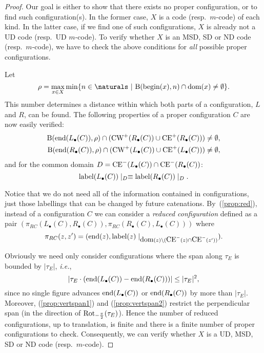 \documentclass[final,nomarks]{dmtcs-episciences}
\newcommand{\dfbegin}[1]{\mbox{\rm begin}(#1)}
\newcommand{\dfend}[1]{\mbox{\rm end}(#1)}
\newcommand{\dflabel}[1]{\mbox{\rm label}(#1)}
\newcommand{\dfdomain}[1]{\mbox{\rm dom}(#1)}
\newcommand{\CEP}[1]{\mbox{\rm CE}^+(#1)}\newcommand{\CEN}[1]{\mbox{\rm CE}^-(#1)}\newcommand{\CWP}[1]{\mbox{\rm CW}^+(#1)}\newcommand{\CWN}[1]{\mbox{\rm CW}^-(#1)}\newcommand{\B}[2]{\mbox{\rm B}(#1,#2)}\newcommand{\HP}[2]{\mbox{\rm HP}(#1,#2)}\newcommand{\R}[2]{\mbox{\rm Rot}_{#1}(#2)}\newcommand{\tr}[1]{\mathrm{tr}_{#1}}
\begin{document}
\begin{proof}
Our goal is either to show that there exists no proper
configuration, or to find such configuration(s). In the former
case, $X$ is a code (resp.\ $m$-code) of each kind. In the
latter case, if we find one of such configurations, $X$ is
already not a UD code (resp.\ UD $m$-code). To verify whether
$X$ is an MSD, SD or ND code (resp.\ $m$-code), we have to check
the above conditions for \emph{all} possible proper
configurations.

Let
\begin{displaymath}
\rho = \max_{x\in X}\min\{ n\in\naturals~|~\B{\dfbegin{x}}{n}\cap\dfdomain{x} \neq\emptyset\}.
\end{displaymath}
This number determines a distance within which both parts 
of a configuration, $L$ and $R$, can be found.
The following properties of a proper configuration $C$ are now easily verified:
\begin{eqnarray}
\label{prop:vertspan1}\B{\dfend{L_{\bullet}(C)}}{\rho} \cap (\CWP{R_{\bullet}(C)}\cup \CEP{R_{\bullet}(C)}) \neq \emptyset,\\
\label{prop:vertspan2}\B{\dfend{R_{\bullet}(C)}}{\rho} \cap (\CWP{L_{\bullet}(C)}\cup \CEP{L_{\bullet}(C)}) \neq \emptyset,
\end{eqnarray}
and for the common domain $D=\CEN{L_{\bullet}(C)}\cap\CEN{R_{\bullet}(C)}$:
\begin{equation}
\label{prop:red}\dflabel{L_{\bullet}(C)}\mid_{D}\equiv\dflabel{R_{\bullet}(C)}\mid_{D}.
\end{equation}

Notice that we do not need all of the information contained in
configurations, just those labellings that can be changed by
future catenations. By~(\ref{prop:red}), instead of a
configuration $C$ we can consider a \emph{reduced configuration}
defined as a pair
$(\pi_{RC}(L_{\bullet}(C),R_{\bullet}(C)),\pi_{RC}(R_{\bullet}(C),L_{\bullet}(C)))$
where
\begin{displaymath}
\pi_{RC}(z,z') = (\dfend{z},\dflabel{z}\mid_{\dfdomain{z}\setminus(\CEN{z}\cap \CEN{z'})}).
\end{displaymath}

Obviously we need only consider configurations where the span
along $\tau_E$ is bounded by $|\tau_E|$, \textit{i.e.},
\begin{displaymath}
|\tau_E\cdot(\dfend{L_{\bullet}(C)}-\dfend{R_{\bullet}(C)})|\leq |\tau_E|^2,
\end{displaymath}
since no single figure advances
$\dfend{L_{\bullet}(C)}$ or $\dfend{R_{\bullet}(C)}$ by more
than $|\tau_E|$. Moreover, (\ref{prop:vertspan1}) and
(\ref{prop:vertspan2}) restrict the perpendicular span (in the
direction of $\R{-\frac{\pi}{2}}{\tau_E}$). Hence the number of
reduced configurations, up to translation, is finite and there
is a finite number of proper configurations to check.
Consequently, we can verify whether $X$ is a UD, MSD, SD or ND
code (resp.\ $m$-code).
\end{proof}
\end{document}
